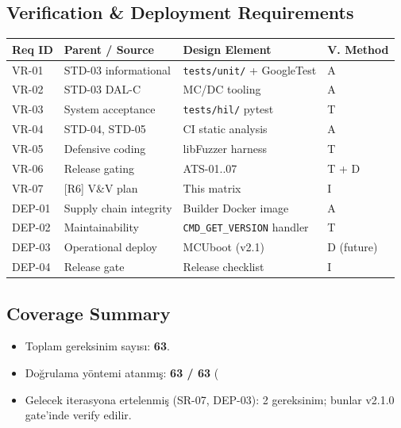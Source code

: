 \subsection{Verification \& Deployment Requirements}
\begin{center}
\begin{tabular}{|l|l|l|l|}
\hline
\textbf{Req ID} & \textbf{Parent / Source} & \textbf{Design Element} & \textbf{V. Method} \\
\hline
VR-01 & STD-03 informational & \texttt{tests/unit/} + GoogleTest & A \\
VR-02 & STD-03 DAL-C & MC/DC tooling & A \\
VR-03 & System acceptance & \texttt{tests/hil/} pytest & T \\
VR-04 & STD-04, STD-05 & CI static analysis & A \\
VR-05 & Defensive coding & libFuzzer harness & T \\
VR-06 & Release gating & ATS-01..07 & T + D \\
VR-07 & [R6] V\&V plan & This matrix & I \\
DEP-01 & Supply chain integrity & Builder Docker image & A \\
DEP-02 & Maintainability & \texttt{CMD\_GET\_VERSION} handler & T \\
DEP-03 & Operational deploy & MCUboot (v2.1) & D (future) \\
DEP-04 & Release gate & Release checklist & I \\
\hline
\end{tabular}
\end{center}

\subsection{Coverage Summary}
\begin{itemize}
    \item Toplam gereksinim sayısı: \textbf{63}.
    \item Doğrulama yöntemi atanmış: \textbf{63 / 63} (%
    \item Gelecek iterasyona ertelenmiş (SR-07, DEP-03): 2 gereksinim; bunlar v2.1.0 gate'inde verify edilir.
\end{itemize}

